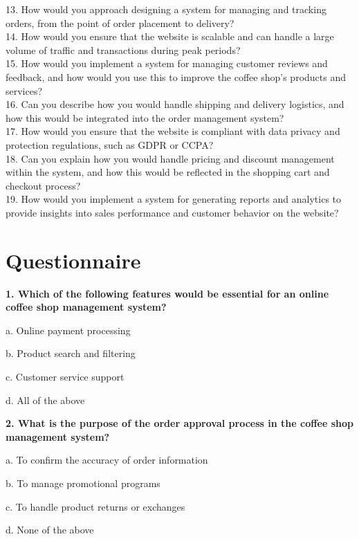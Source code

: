 13. How would you approach designing a system for managing and tracking orders, from the point of order placement to delivery?	\\									
14. How would you ensure that the website is scalable and can handle a large volume of traffic and transactions during peak periods?		\\								
15. How would you implement a system for managing customer reviews and feedback, and how would you use this to improve the coffee shop's products and services?					\\					
16. Can you describe how you would handle shipping and delivery logistics, and how this would be integrated into the order management system?\\										
17. How would you ensure that the website is compliant with data privacy and protection regulations, such as GDPR or CCPA?			\\							
18. Can you explain how you would handle pricing and discount management within the system, and how this would be reflected in the shopping cart and checkout process?								\\		
19. How would you implement a system for generating reports and analytics to provide insights into sales performance and customer behavior on the website?\\	


\section{Questionnaire}

\textbf{1. Which of the following features would be essential for an online coffee shop management system?}

a. Online payment processing

b. Product search and filtering

c. Customer service support

d. All of the above

\medskip

\textbf{2. What is the purpose of the order approval process in the coffee shop management system?}

a. To confirm the accuracy of order information

b. To manage promotional programs

c. To handle product returns or exchanges

d. None of the above

\medskip

